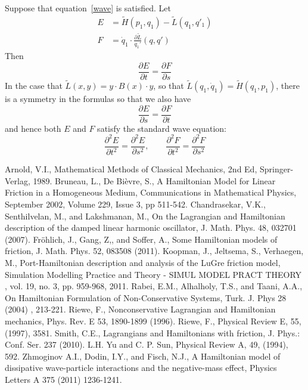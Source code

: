 \documentclass{amsart}
\begin{document}
Suppose that equation~\eqref{wave} is satisfied.  Let
\begin{align}
E &= \tilde H(p_1,q_1) - \tilde L(q_1,q'_1) \\
F &= \dot q_1 \cdot \frac{\partial \tilde L}{q_1'} (q,q')
\end{align}
Then
\begin{equation}
\frac{\partial E}{\partial t} = \frac{\partial F}{\partial s}
\end{equation}
In the case that $\tilde L(x,y) = y \cdot B(x) \cdot y$, so that $\tilde L(q_1,\dot q_1) = \tilde H(q_1,p_1)$, there is a symmetry in the formulas so that we also have
\begin{equation}
\frac{\partial E}{\partial s} = \frac{\partial F}{\partial t}
\end{equation}
and hence both $E$ and $F$ satisfy the standard wave equation:
\begin{equation}
\frac{\partial^2 E}{\partial t^2} = \frac{\partial^2 E}{\partial s^2}, \qquad
\frac{\partial^2 F}{\partial t^2} = \frac{\partial^2 F}{\partial s^2}
\end{equation}



\begin{thebibliography}{99}
Arnold, V.I., Mathematical Methods of Classical Mechanics, 2nd Ed, Springer-Verlag, 1989.
Bruneau, L., De Bi\`evre, S., A Hamiltonian Model for Linear Friction in a Homogeneous Medium, Communications in Mathematical Physics, September 2002, Volume 229, Issue 3, pp 511-542.
Chandrasekar, V.K., Senthilvelan, M., and Lakshmanan, M., On the Lagrangian and Hamiltonian description of the damped linear harmonic oscillator, J. Math. Phys. 48, 032701 (2007).
Fr\"ohlich, J., Gang, Z,, and Soffer, A., Some Hamiltonian models of friction, J. Math. Phys. 52, 083508 (2011).
Koopman, J., Jeltsema, S., Verhaegen, M., Port-Hamiltonian description and analysis of the LuGre friction model, Simulation Modelling Practice and Theory - SIMUL MODEL PRACT THEORY , vol. 19, no. 3, pp. 959-968, 2011.
Rabei, E.M., Alhalholy, T.S., and Taani, A.A., On Hamiltonian Formulation of Non-Conservative Systems, Turk. J. Phys 28 (2004) , 213-221.
 Riewe, F., Nonconservative Lagrangian and Hamiltonian mechanics, Phys. Rev. E 53, 1890-1899 (1996).
 Riewe, F., Physical Review E, 55, (1997), 3581.
Smith, C.E., Lagrangians and Hamiltonians with friction, J. Phys.: Conf. Ser. 237 (2010).
L.H. Yu and C. P. Sun, Physical Review A, 49, (1994), 592.
Zhmoginov A.I., Dodin, I.Y., and Fisch, N.J., A Hamiltonian model of dissipative wave-particle interactions and the negative-mass effect, Physics Letters A 375 (2011) 1236-1241.
\end{thebibliography}
\end{document}
